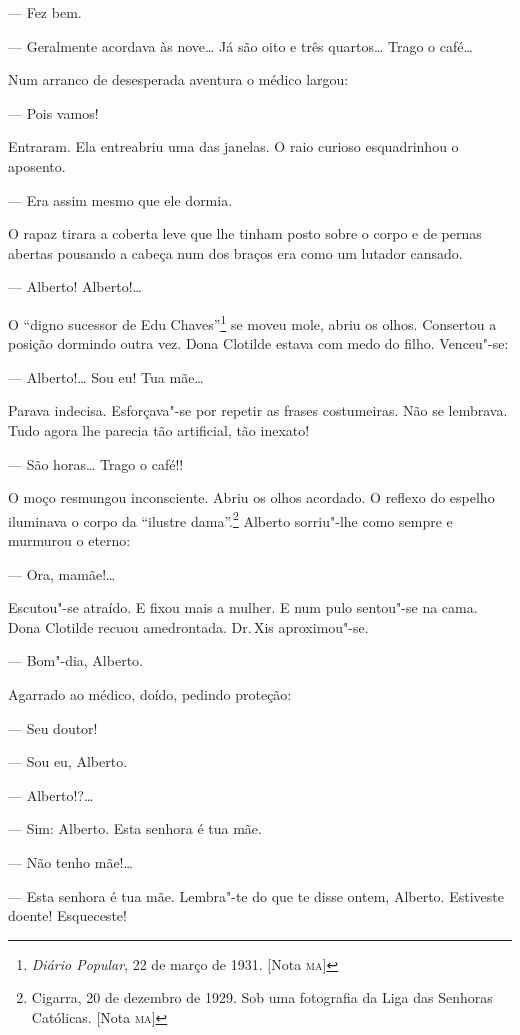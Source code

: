 \begin{linenumbers}
--- Fez bem.

--- Geralmente acordava às nove\ldots{} Já são oito e três quartos\ldots{} Trago o
café\ldots{}

Num arranco de desesperada aventura o médico largou:

--- Pois vamos!

Entraram. Ela entreabriu uma das janelas. O raio curioso esquadrinhou o
aposento.

--- Era assim mesmo que ele dormia.

O rapaz tirara a coberta leve que lhe tinham posto sobre o corpo e de
pernas abertas pousando a cabeça num dos braços era como um lutador
cansado.

--- Alberto! Alberto!\ldots{}

O ``digno sucessor de Edu Chaves''\footnote{\emph{Diário Popular}, 22 de
  março de 1931. {[}Nota \textsc{ma}{]}} se moveu mole, abriu os olhos. Consertou
a posição dormindo outra vez. Dona Clotilde estava com medo do filho.
Venceu"-se:

--- Alberto!\ldots{} Sou eu! Tua mãe\ldots{}

Parava indecisa. Esforçava"-se por repetir as frases costumeiras. Não se
lembrava. Tudo agora lhe parecia tão artificial, tão inexato!

--- São horas\ldots{} Trago o café!!

O moço resmungou inconsciente. Abriu os olhos acordado. O reflexo do
espelho iluminava o corpo da ``ilustre dama''.\footnote{Cigarra, 20 de
  dezembro de 1929. Sob uma fotografia da Liga das Senhoras Católicas.
  {[}Nota \textsc{ma}{]}} Alberto sorriu"-lhe como sempre e murmurou o eterno:

--- Ora, mamãe!\ldots{}

Escutou"-se atraído. E fixou mais a mulher. E num pulo sentou"-se na cama.
Dona Clotilde recuou amedrontada. Dr.\,Xis aproximou"-se.

--- Bom"-dia, Alberto.

Agarrado ao médico, doído, pedindo proteção:

--- Seu doutor!

--- Sou eu, Alberto.

--- Alberto!?\ldots{}

--- Sim: Alberto. Esta senhora é tua mãe.

--- Não tenho mãe!\ldots{}

--- Esta senhora é tua mãe. Lembra"-te do que te disse ontem, Alberto.
Estiveste doente! Esqueceste!


\end{linenumbers}
